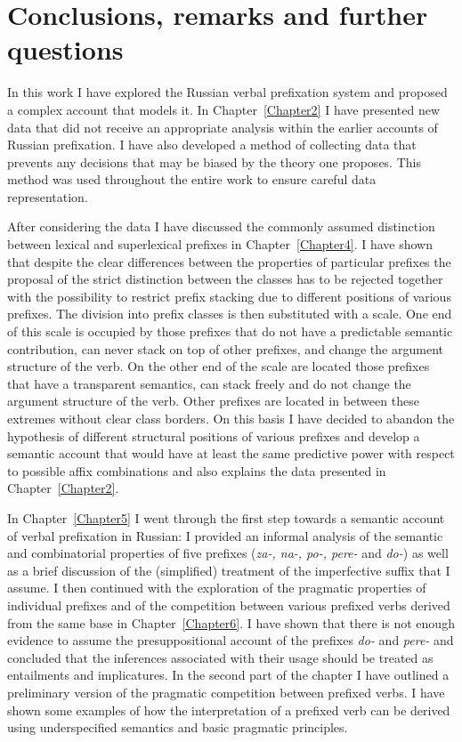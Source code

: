 
\chapter{Conclusions, remarks and further questions} %
\label{Chapter9}

In this work I have explored the Russian verbal prefixation system and proposed a complex account that models it. In Chapter~\ref{Chapter2} I have presented new data that did not receive an appropriate analysis within the earlier accounts of Russian prefixation. I have also developed a method of collecting data that prevents any decisions that may be biased by the theory one proposes. This method was used throughout the entire work to ensure careful data representation.

After considering the data I have discussed the commonly assumed distinction between lexical and superlexical prefixes in Chapter~\ref{Chapter4}. I have shown that despite the clear differences between the properties of particular prefixes the proposal of the strict distinction between the classes has to be rejected together with the possibility to restrict prefix stacking due to different positions of various prefixes. The division into prefix classes is then substituted with a scale. One end of this scale is occupied by those prefixes that do not have a predictable semantic contribution, can never stack on top of other prefixes, and change the argument structure of the verb. On the other end of the scale are located those prefixes that have a transparent semantics, can stack freely and do not change the argument structure of the verb. Other prefixes are located in between these extremes without clear class borders. On this basis I have decided to abandon the hypothesis of different structural positions of various prefixes and develop a semantic account that would have at least the same predictive power with respect to possible affix combinations and also explains the data presented in Chapter~\ref{Chapter2}.

In Chapter~\ref{Chapter5} I went through the first step towards a semantic account of verbal prefixation in Russian: I provided an informal analysis of the semantic and combinatorial properties of five prefixes (\textit{za-, na-, po-, pere-} and \textit{do-}) as well as a brief discussion of the (simplified) treatment of the imperfective suffix that I assume. I then continued with the exploration of the pragmatic properties of individual prefixes and of the competition between various prefixed verbs derived from the same base in Chapter~\ref{Chapter6}. I have shown that there is not enough evidence to assume the presuppositional account of the prefixes \textit{do-} and \textit{pere-} and concluded that the inferences associated with their usage should be treated as entailments and implicatures. In the second part of the chapter I have outlined a preliminary version of the pragmatic competition between prefixed verbs. I have shown some examples of how the interpretation of a prefixed verb can be derived using underspecified semantics and basic pragmatic principles. 

